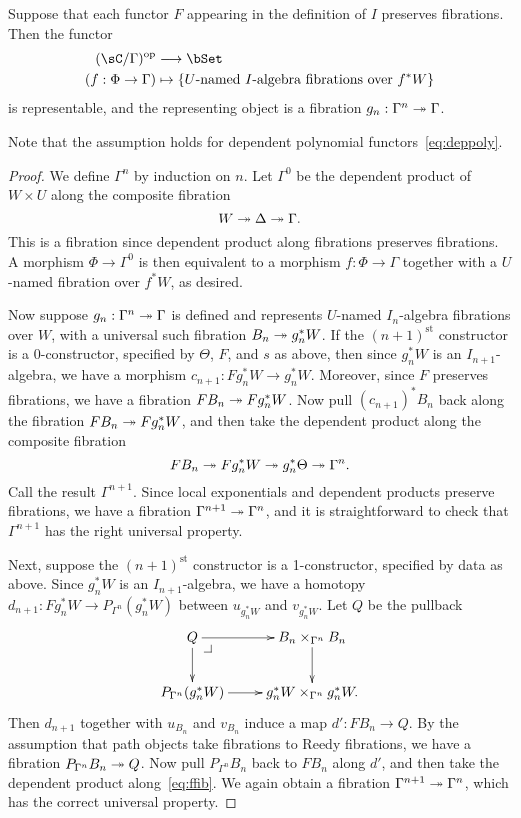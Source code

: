 \documentclass{amsart}
\begin{document}
\begin{lem}\label{thm:univfib}
  Suppose that each functor $F$ appearing in the definition of $I$ preserves fibrations.
  Then the functor
  \begin{align}
    (\sC/\Gamma)\op &\too \bSet\\
    (f:\Phi\to\Gamma) &\mapsto \{ \text{$U$-named $I$-algebra fibrations over $f^*W$} \}
  \end{align}
  is representable, and the representing object is a fibration $g_n:\Gamma^n \twoheadrightarrow\Gamma$.
\end{lem}
Note that the assumption holds for dependent polynomial functors~\eqref{eq:deppoly}.
\begin{proof}
  We define $\Gamma^n$ by induction on $n$.
  Let $\Gamma^0$ be the dependent product of $W\times U$ along the composite fibration
  \[W \twoheadrightarrow \Delta\twoheadrightarrow \Gamma.\]
  This is a fibration since dependent product along fibrations preserves fibrations.
  A morphism $\Phi\to\Gamma^0$ is then equivalent to a morphism $f:\Phi\to\Gamma$ together with a $U$-named fibration over $f^*W$, as desired.

  Now suppose $g_n:\Gamma^n \twoheadrightarrow\Gamma$ is defined and represents $U$-named $I_n$-algebra fibrations over $W$, with a universal such fibration $B_n \twoheadrightarrow g_n^*W$.
  If the $(n+1)^{\mathrm{st}}$ constructor is a 0-constructor, specified by $\Theta$, $F$, and $s$ as above, then since $g_n^*W$ is an $I_{n+1}$-algebra, we have a morphism $c_{n+1}:F g_n^* W \to g_n^*W$.
  Moreover, since $F$ preserves fibrations, we have a fibration $F B_n \twoheadrightarrow F g_n^*W$.
  Now pull $(c_{n+1})^* B_n$ back along the fibration $F B_n \twoheadrightarrow F g_n^* W$, and then take the dependent product along the composite fibration
  \begin{equation}
    F B_n \fib F g_n^* W \fib g_n^*\Theta \fib \Gamma^n.\label{eq:ffib}
  \end{equation}
  Call the result $\Gamma^{n+1}$.
  Since local exponentials and dependent products preserve fibrations, we have a fibration $\Gamma^{n+1}\twoheadrightarrow\Gamma^n$, and it is straightforward to check that $\Gamma^{n+1}$ has the right universal property.

  Next, suppose the $(n+1)^{\mathrm{st}}$ constructor is a 1-constructor, specified by data as above.
  Since $g_n^*W$ is an $I_{n+1}$-algebra, we have a homotopy $d_{n+1}:F g_n^*W \to P_{\Gamma^n} (g_n^*W)$ between $u_{g_n^*W}$ and $v_{g_n^*W}$.
  Let $Q$ be the pullback
  \begin{equation}
  \vcenter{\xymatrix{
      Q\ar[r]\ar[d] \pullbackcorner &
      B_n \times_{\Gamma^n} B_n\ar[d]\\
      P_{\Gamma^n} (g_n^* W)\ar[r] &
      g_n^* W \times_{\Gamma^n} g_n^* W.
      }}
  \end{equation}
  Then $d_{n+1}$ together with $u_{B_n}$ and $v_{B_n}$ induce a map $d':F B_n \to Q$.
  By the assumption that path objects take fibrations to Reedy fibrations, we have a fibration $P_{\Gamma^n} B_n \twoheadrightarrow Q$.
  Now pull $P_{\Gamma^n} B_n$ back to $F B_n$ along $d'$, and then take the dependent product along~\eqref{eq:ffib}.
  We again obtain a fibration $\Gamma^{n+1}\twoheadrightarrow\Gamma^n$, which has the correct universal property.
\end{proof}
\end{document}
